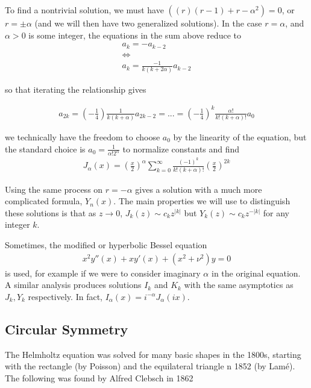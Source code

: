 \documentclass{article}
\begin{document}
	To find a nontrivial solution, we must have $((r)(r-1)+ r -\alpha^{2}) = 0$, or $r = \pm \alpha$ (and we will then have two generalized solutions). In the case $r = \alpha$, and $\alpha > 0$ is some integer, the equations in the sum above reduce to 
	\begin{align*}
		[(\alpha+k)^{2} -\alpha^{2}]a_{k} = - a_{k-2} \\
		\Leftrightarrow \\
		a_{k} = \frac{-1}{k(k+2\alpha)} a_{k-2}
	\end{align*}
	
	so that iterating the relationship gives
	
	\begin{align*}
		a_{2k} =  \left( -\frac{1}{4} \right) \frac{1}{k(k+\alpha)} a_{2k-2} = ... = \left( -\frac{1}{4} \right)^{k} \frac{\alpha!}{k!(k+\alpha)!} a_{0}
	\end{align*}
	
	we technically have the freedom to choose $a_0$ by the linearity of the equation, but the standard choice is $a_0 = \frac{1}{\alpha! 2^{\alpha}}$ to normalize constants and find
	\begin{align*}
		J_{\alpha}(x) = \left(\frac{x}{2}\right)^{\alpha}\sum_{k=0}^{\infty} \frac{(-1)^{k}}{k!(k+\alpha)!} \left( \frac{x}{2}\right)^{2k} 
	\end{align*}
	
	Using the same process on $r = -\alpha$ gives a solution with a much more complicated formula, $Y_{n}(x)$. The main properties we will use to distinguish these solutions is that as $z \to 0$, $J_{k}(z) \sim c_{k} z^{|k|}$ but $Y_{k}(z) \sim c_{k} z^{-|k|}$ for any integer $k$. 
	
	Sometimes, the modified or hyperbolic Bessel equation
	\begin{align*}
		x^{2} y''(x) + xy'(x) + (x^{2} + \nu^{2}) y = 0
	\end{align*}
	is used, for example if we were to consider imaginary $\alpha$ in the original equation. A similar analysis produces solutions $I_k$ and $K_k$ with the same asymptotics as $J_k,Y_k$ respectively. In fact, $I_{\alpha}(x) = i^{-\alpha} J_{\alpha}(ix)$.  
	
	
	\subsection{Circular Symmetry}
	
	The Helmholtz equation was solved for many basic shapes in the 1800s, starting with the rectangle (by Poisson) and the equilateral triangle n 1852 (by Lam{\'e}). The following was found by Alfred Clebsch in 1862
	
\end{document}
